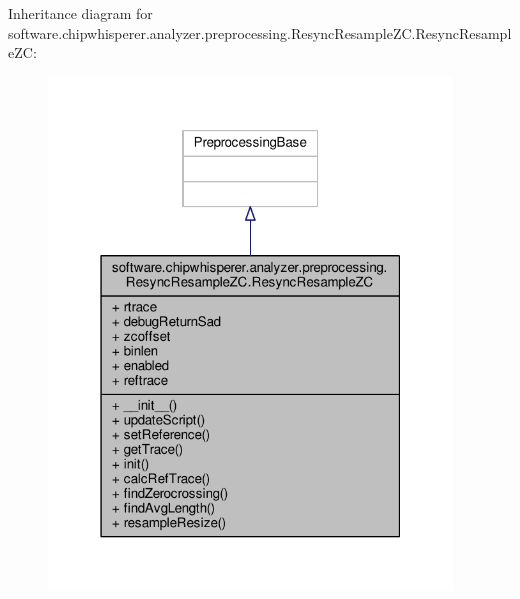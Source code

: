 Inheritance diagram for software.\+chipwhisperer.\+analyzer.\+preprocessing.\+Resync\+Resample\+Z\+C.\+Resync\+Resample\+Z\+C\+:\nopagebreak
\begin{figure}[H]
\begin{center}
\leavevmode
\includegraphics[width=304pt]{da/dcc/classsoftware_1_1chipwhisperer_1_1analyzer_1_1preprocessing_1_1ResyncResampleZC_1_1ResyncResampleZC__inherit__graph}
\end{center}
\end{figure}


